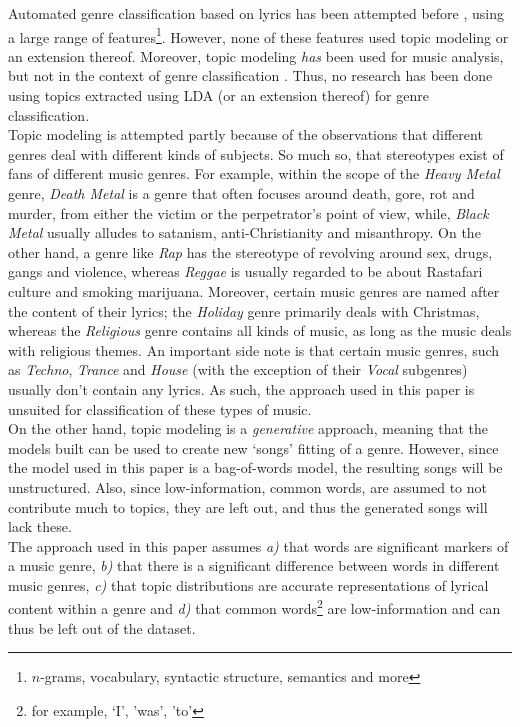 
Automated genre classification based on lyrics has been attempted before \cite{fell lyrics}, using a large range of features\footnote{$n$-grams, vocabulary, syntactic structure, semantics and more}. However, none of these features used topic modeling or an extension thereof. Moreover, topic modeling \textit{has} been used for music analysis, but not in the context of genre classification \cite{lukiccomparison} \cite{liartists}. Thus, no research has been done using topics extracted using LDA (or an extension thereof) for genre classification. \\
Topic modeling is attempted partly because of the observations that different genres deal with different kinds of subjects. So much so, that stereotypes exist of fans of different music genres. For example, within the scope of the \textit{Heavy Metal} genre, \textit{Death Metal} is a genre that often focuses around death, gore, rot and murder, from either the victim or the perpetrator's point of view, while, \textit{Black Metal} usually alludes to satanism, anti-Christianity and misanthropy. On the other hand, a genre like \textit{Rap} has the stereotype of revolving around sex, drugs, gangs and violence, whereas \textit{Reggae} is usually regarded to be about Rastafari culture and smoking marijuana. Moreover, certain music genres are named after the content of their lyrics; the \textit{Holiday} genre primarily deals with Christmas, whereas the \textit{Religious} genre contains all kinds of music, as long as the music deals with religious themes. An important side note is that certain music genres, such as \textit{Techno}, \textit{Trance} and \textit{House} (with the exception of their \textit{Vocal} subgenres) usually don't contain any lyrics. As such, the approach used in this paper is unsuited for classification of these types of music. \\
On the other hand, topic modeling is a \textit{generative} approach, meaning that the models built can be used to create new `songs' fitting of a genre. However, since the model used in this paper is a bag-of-words model, the resulting songs will be unstructured. Also, since low-information, common words, are assumed to not contribute much to topics, they are left out, and thus the generated songs will lack these.\\
The approach used in this paper assumes \textit{a)} that words are significant markers of a music genre, \textit{b)} that there is a significant difference between words in different music genres, \textit{c)} that topic distributions are accurate representations of lyrical content within a genre and \textit{d)} that common words\footnote{for example, `I', 'was', 'to'} are low-information and can thus be left out of the dataset. \\

